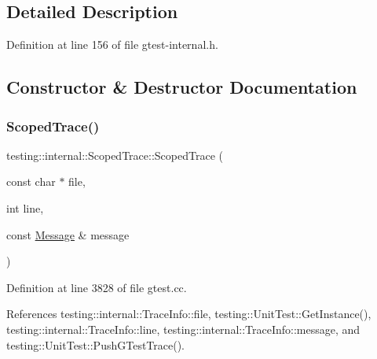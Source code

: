 \subsection{Detailed Description}


Definition at line 156 of file gtest-\/internal.\+h.



\subsection{Constructor \& Destructor Documentation}
\mbox{\label{classtesting_1_1internal_1_1ScopedTrace_ab965d7010bbbc82c1bef6ebf8748bede}} 
\subsubsection{\texorpdfstring{Scoped\+Trace()}{ScopedTrace()}}
{\footnotesize\ttfamily testing\+::internal\+::\+Scoped\+Trace\+::\+Scoped\+Trace (\begin{DoxyParamCaption}\item[{const char $\ast$}]{file,  }\item[{int}]{line,  }\item[{const \hyperlink{classtesting_1_1Message}{Message} \&}]{message }\end{DoxyParamCaption})}



Definition at line 3828 of file gtest.\+cc.



References testing\+::internal\+::\+Trace\+Info\+::file, testing\+::\+Unit\+Test\+::\+Get\+Instance(), testing\+::internal\+::\+Trace\+Info\+::line, testing\+::internal\+::\+Trace\+Info\+::message, and testing\+::\+Unit\+Test\+::\+Push\+G\+Test\+Trace().


